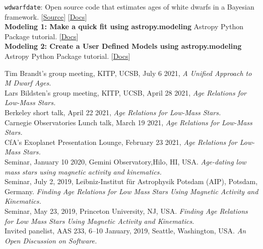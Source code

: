 \documentclass[10pt]{cv}
\begin{document}
\begin{llist}

\texttt{wdwarfdate}: Open source code that estimates ages of white dwarfs in a Bayesian framework. [\href{https://github.com/rkiman/wdwarfdate}{Source}] [\href{https://wdwarfdate.readthedocs.io/en/latest/}{Docs}] \\
\textbf{Modeling 1: Make a quick fit using astropy.modeling}
Astropy Python Package tutorial. [\href{http://learn.astropy.org/rst-tutorials/Models-Quick-Fit.html?highlight=filtertutorials}{Docs}]\\
\textbf{Modeling 2: Create a User Defined Models using astropy.modeling}
Astropy Python Package tutorial. [\href{http://learn.astropy.org/rst-tutorials/User-Defined-Model.html?highlight=filtertutorials}{Docs}] 


Tim Brandt's group meeting, KITP, UCSB, July 6 2021, \textit{A Unified Approach to M Dwarf Ages.}\\
Lars Bildsten's group meeting, KITP, UCSB, April 28 2021, \textit{Age Relations for Low-Mass Stars.}\\
Berkeley short talk, April 22 2021, \textit{Age Relations for Low-Mass Stars.}\\
Carnegie Observatories Lunch talk, March 19 2021, \textit{Age Relations for Low-Mass Stars.}\\
CfA's Exoplanet Presentation Lounge, February 23 2021, \textit{Age Relations for Low-Mass Stars.}\\ 
Seminar, January 10 2020, Gemini Observatory,Hilo, HI, USA. \textit{Age-dating low mass stars using magnetic activity and kinematics.}\\
Seminar, July 2, 2019, Leibniz-Institut f\"{u}r Astrophysik Potsdam (AIP), Potsdam, Germany. \textit{Finding Age Relations for Low Mass Stars Using Magnetic Activity and Kinematics.}\\
Seminar, May 23, 2019, Princeton University, NJ, USA. \textit{Finding Age Relations for Low Mass Stars Using Magnetic Activity and Kinematics.} \\
Invited panelist, AAS 233, 6--10 January, 2019, Seattle, Washington, USA. \textit{An Open Discussion on Software.} 



\end{llist}
\end{document}
